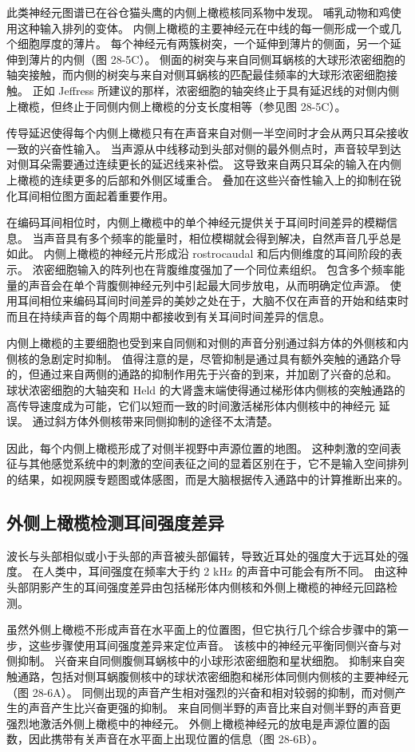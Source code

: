 此类神经元图谱已在谷仓猫头鹰的内侧上橄榄核同系物中发现。 哺乳动物和鸡使用这种输入排列的变体。 内侧上橄榄的主要神经元在中线的每一侧形成一个或几个细胞厚度的薄片。 每个神经元有两簇树突，一个延伸到薄片的侧面，另一个延伸到薄片的内侧（图 28-5C）。 侧面的树突与来自同侧耳蜗核的大球形浓密细胞的轴突接触，而内侧的树突与来自对侧耳蜗核的匹配最佳频率的大球形浓密细胞接触。 正如 Jeffress 所建议的那样，浓密细胞的轴突终止于具有延迟线的对侧内侧上橄榄，但终止于同侧内侧上橄榄的分支长度相等（参见图 28-5C）。

传导延迟使得每个内侧上橄榄只有在声音来自对侧一半空间时才会从两只耳朵接收一致的兴奋性输入。 当声源从中线移动到头部对侧的最外侧点时，声音较早到达对侧耳朵需要通过连续更长的延迟线来补偿。 这导致来自两只耳朵的输入在内侧上橄榄的连续更多的后部和外侧区域重合。 叠加在这些兴奋性输入上的抑制在锐化耳间相位图方面起着重要作用。

在编码耳间相位时，内侧上橄榄中的单个神经元提供关于耳间时间差异的模糊信息。 当声音具有多个频率的能量时，相位模糊就会得到解决，自然声音几乎总是如此。 内侧上橄榄的神经元片形成沿 rostrocaudal 和后内侧维度的耳间阶段的表示。 浓密细胞输入的阵列也在背腹维度强加了一个同位素组织。 包含多个频率能量的声音会在单个背腹侧神经元列中引起最大同步放电，从而明确定位声源。 使用耳间相位来编码耳间时间差异的美妙之处在于，大脑不仅在声音的开始和结束时而且在持续声音的每个周期中都接收到有关耳间时间差异的信息。

内侧上橄榄的主要细胞也受到来自同侧和对侧的声音分别通过斜方体的外侧核和内侧核的急剧定时抑制。 值得注意的是，尽管抑制是通过具有额外突触的通路介导的，但通过来自两侧的通路的抑制作用先于兴奋的到来，并加剧了兴奋的总和。 球状浓密细胞的大轴突和 Held 的大肾盏末端使得通过梯形体内侧核的突触通路的高传导速度成为可能，它们以短而一致的时间激活梯形体内侧核中的神经元 延误。 通过斜方体外侧核带来同侧抑制的途径不太清楚。

因此，每个内侧上橄榄形成了对侧半视野中声源位置的地图。 这种刺激的空间表征与其他感觉系统中的刺激的空间表征之间的显着区别在于，它不是输入空间排列的结果，如视网膜专题图或体感图，而是大脑根据传入通路中的计算推断出来的。


\subsection{外侧上橄榄检测耳间强度差异}
波长与头部相似或小于头部的声音被头部偏转，导致近耳处的强度大于远耳处的强度。 在人类中，耳间强度在频率大于约 2 kHz 的声音中可能会有所不同。 由这种头部阴影产生的耳间强度差异由包括梯形体内侧核和外侧上橄榄的神经元回路检测。

虽然外侧上橄榄不形成声音在水平面上的位置图，但它执行几个综合步骤中的第一步，这些步骤使用耳间强度差异来定位声音。 该核中的神经元平衡同侧兴奋与对侧抑制。 兴奋来自同侧腹侧耳蜗核中的小球形浓密细胞和星状细胞。 抑制来自突触通路，包括对侧耳蜗腹侧核中的球状浓密细胞和梯形体同侧内侧核的主要神经元（图 28-6A）。 同侧出现的声音产生相对强烈的兴奋和相对较弱的抑制，而对侧产生的声音产生比兴奋更强的抑制。 来自同侧半野的声音比来自对侧半野的声音更强烈地激活外侧上橄榄中的神经元。 外侧上橄榄神经元的放电是声源位置的函数，因此携带有关声音在水平面上出现位置的信息（图 28-6B）。

